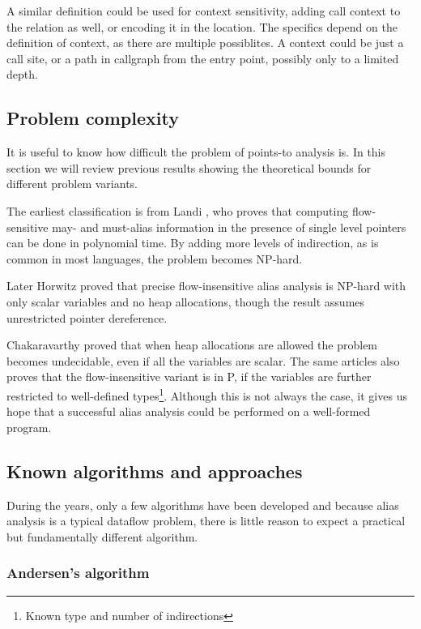 A similar definition could be used for context sensitivity, adding call context
to the relation as well, or encoding it in the location. The specifics depend on
the definition of context, as there are multiple possiblites. A context could be
just a call site, or a path in callgraph from the entry point, possibly only to
a limited depth.

\subsection{Problem complexity}

It is useful to know how difficult the problem of points-to analysis is. In this
section we will review previous results showing the theoretical bounds for
different problem variants.

The earliest classification is from Landi \cite{Landi1991}, who proves that
computing flow-sensitive may- and must-alias information in the presence of
single level pointers can be done in polynomial time. By adding more levels of
indirection, as is common in most languages, the problem becomes NP-hard.

Later Horwitz \cite{Horwitz1997}  proved that precise flow-insensitive alias
analysis is NP-hard with only scalar variables and no heap allocations, though
the result assumes unrestricted pointer dereference.

Chakaravarthy \cite{ptcomp} proved that when heap allocations are allowed the
problem becomes undecidable, even if all the variables are scalar. The same
articles also proves that the flow-insensitive variant is in P, if the
variables are further restricted to well-defined types\footnote{Known type and
number of indirections}. Although this is not always the case, it gives us hope
that a successful alias analysis could be performed on a well-formed program.



\subsection{Known algorithms and approaches}

During the years, only a few algorithms have been developed and because alias
analysis is a typical dataflow problem, there is little reason to expect a
practical but fundamentally different algorithm.

\subsubsection{Andersen's algorithm}

